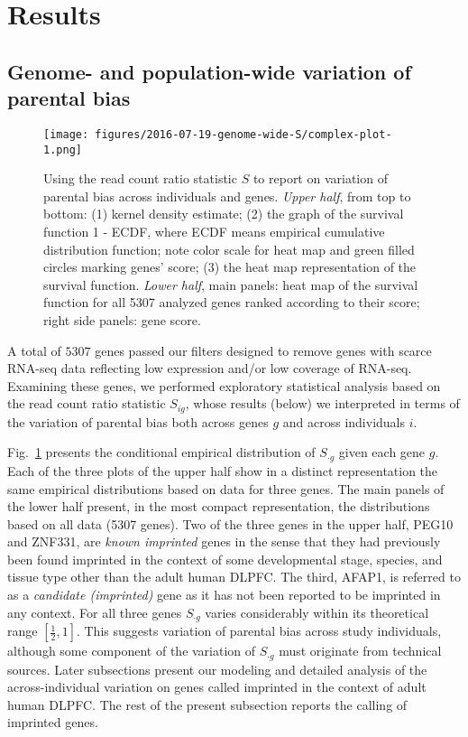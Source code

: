 \documentclass[letterpaper]{article}
\begin{document}
\section{Results}

\subsection{Genome- and population-wide variation of parental bias}

\begin{figure}
\begin{center}
\texttt{[image: figures/2016-07-19-genome-wide-S/complex-plot-1.png]}
\end{center}
\caption{
Using the read count ratio statistic \(S\) to report on variation of parental
bias across individuals and genes.  \emph{Upper half}, from top to bottom: (1)
kernel density estimate; (2) the graph of the survival function 1 - ECDF,
where ECDF means empirical cumulative distribution function; note color scale
for heat map and green filled circles marking genes' score; (3) the heat map
representation of the survival function.  \emph{Lower half}, main panels: heat
map of the survival function for all 5307 analyzed genes ranked according to
their score; right side panels: gene score.
}
\label{fig:ranking-genes}
\end{figure}

A total of \(5307\) genes passed our filters designed to remove genes with
scarce RNA-seq data reflecting low expression and/or low coverage of RNA-seq.
Examining these genes, we performed exploratory statistical analysis based on
the read count ratio statistic \(S_{ig}\), whose results (below) we
interpreted in terms of the variation of parental bias both across genes \(g\)
and across individuals \(i\).

Fig.~\ref{fig:ranking-genes} presents the conditional empirical distribution
of \(S_{\cdot g}\) given each gene \(g\).  Each of the three plots of the
upper half show in a distinct representation the same empirical distributions
based on data for three genes.  The main panels of the lower half present, in
the most compact representation, the distributions based on all data (5307
genes).  Two of the three genes in the upper half, PEG10 and ZNF331, are
\emph{known imprinted} genes in the sense that they had previously been found
imprinted in the context of some developmental stage, species, and tissue type
other than the adult human DLPFC.  The third, AFAP1, is referred to as a
\emph{candidate (imprinted)} gene as it has not been reported to be imprinted
in any context.  For all three genes \(S_{\cdot g}\) varies considerably
within its theoretical range \([\frac{1}{2}, 1]\).  This suggests variation of
parental bias across study individuals, although some component of the
variation of \(S_{\cdot g}\) must originate from technical sources.  Later
subsections present our modeling and detailed analysis of the
across-individual variation on genes called imprinted in the context of adult
human DLPFC.  The rest of the present subsection reports the calling of
imprinted genes.
\end{document}
